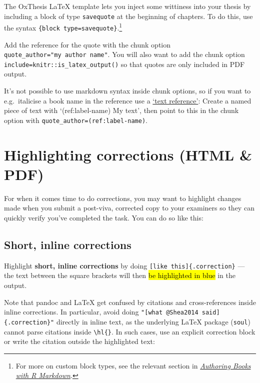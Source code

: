 \documentclass[a4paper, nobind]{templates/ociamthesis}
\begin{document}
The OxThesis LaTeX template lets you inject some wittiness into your thesis by including a block of type \texttt{savequote} at the beginning of chapters.
To do this, use the syntax \texttt{\textasciigrave{}\textasciigrave{}\textasciigrave{}\{block\ type=\textquotesingle{}savequote\textquotesingle{}\}}.\footnote{For more on custom block types, see the relevant section in \href{https://bookdown.org/yihui/bookdown/custom-blocks.html}{\emph{Authoring Books with R Markdown}}.}

Add the reference for the quote with the chunk option \texttt{quote\_author="my\ author\ name"}.
You will also want to add the chunk option \texttt{include=knitr::is\_latex\_output()} so that quotes are only included in PDF output.

It's not possible to use markdown syntax inside chunk options, so if you want to e.g.~italicise a book name in the reference use a \href{https://bookdown.org/yihui/bookdown/markdown-extensions-by-bookdown.html\#text-references}{`text reference'}: Create a named piece of text with `(ref:label-name) My text', then point to this in the chunk option with \texttt{quote\_author=\textquotesingle{}(ref:label-name)\textquotesingle{}}.

\section{Highlighting corrections (HTML \& PDF)}\label{highlighting-corrections-html-pdf}

For when it comes time to do corrections, you may want to highlight changes made when you submit a post-viva, corrected copy to your examiners so they can quickly verify you've completed the task.
You can do so like this:

\subsection{Short, inline corrections}\label{short-inline-corrections}

Highlight \textbf{short, inline corrections} by doing \texttt{{[}like\ this{]}\{.correction\}} --- the text between the square brackets will then \hl{be highlighted in blue} in the output.

Note that pandoc and LaTeX get confused by citations and cross-references inside inline corrections.
In particular, avoid doing \texttt{"{[}what\ @Shea2014\ said{]}\{.correction\}"} directly in inline text, as the underlying LaTeX package (\texttt{soul}) cannot parse citations inside \texttt{\textbackslash{}hl\{\}}.
In such cases, use an explicit correction block or write the citation outside the highlighted text:
\end{document}
